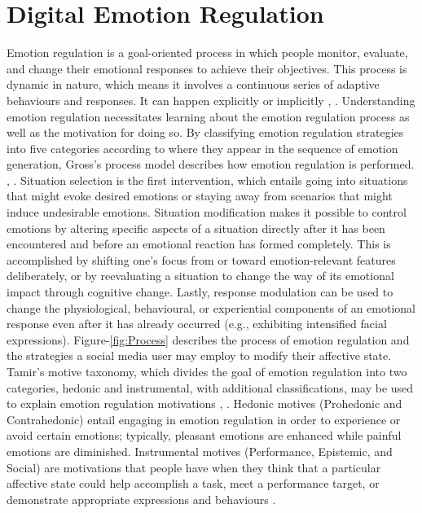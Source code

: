 \documentclass[lettersize,journal]{IEEEtran}
\begin{document}
\section{Digital Emotion Regulation}
Emotion regulation is a goal-oriented process in which people monitor, evaluate, and change their emotional responses to achieve their objectives. This process is dynamic in nature, which means it involves a continuous series of adaptive behaviours and responses. It can happen explicitly or implicitly \cite{braunstein2017explicit}, \cite{gyurak2011explicit}.
Understanding emotion regulation necessitates learning about the emotion regulation process as well as the motivation for doing so. By classifying emotion regulation strategies into five categories according to where they appear in the sequence of emotion generation, Gross's process model describes how emotion regulation is performed. \cite{wadley2020digital}, \cite{gross1998emerging}. Situation selection is the first intervention, which entails going into situations that might evoke desired emotions or staying away from scenarios that might induce undesirable emotions. Situation modification makes it possible to control emotions by altering specific aspects of a situation directly after it has been encountered and before an emotional reaction has formed completely. This is accomplished by shifting one's focus from or toward emotion-relevant features deliberately, or by reevaluating a situation to change the way of its emotional impact through cognitive change. Lastly, response modulation can be used to change the physiological, behavioural, or experiential components of an emotional response even after it has already occurred (e.g., exhibiting intensified facial expressions).  Figure-\ref{fig:Process} describes the process of emotion regulation and the strategies a social media user may employ to modify their affective state. Tamir's motive taxonomy, which divides the goal of emotion regulation into two categories, hedonic and instrumental, with additional classifications, may be used to explain emotion regulation motivations \cite{wadley2020digital}, \cite{tamir2016people}. Hedonic motives (Prohedonic and Contrahedonic) entail engaging in emotion regulation in order to experience or avoid certain emotions; typically, pleasant emotions are enhanced while painful emotions are diminished. Instrumental motives (Performance, Epistemic, and Social) are motivations that people have when they think that a particular affective state could help accomplish a task, meet a performance target, or demonstrate appropriate expressions and behaviours \cite{wadley2020digital}.
\end{document}
